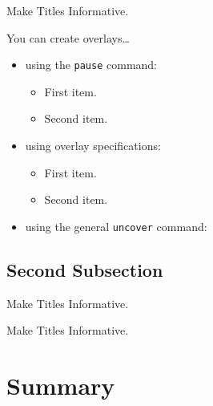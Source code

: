 \documentclass{beamer}
\begin{document}
\begin{frame}{Make Titles Informative.}

  You can create overlays\dots
  \begin{itemize}
  \item using the \texttt{pause} command:
    \begin{itemize}
    \item
      First item.
      \pause
    \item    
      Second item.
    \end{itemize}
  \item
    using overlay specifications:
    \begin{itemize}
    \item<3->
      First item.
    \item<4->
      Second item.
    \end{itemize}
  \item
    using the general \texttt{uncover} command:
    \begin{itemize}
    \end{itemize}
  \end{itemize}
\end{frame}


\subsection{Second Subsection}

\begin{frame}{Make Titles Informative.}
\end{frame}

\begin{frame}{Make Titles Informative.}
\end{frame}



\section*{Summary}
\end{document}
